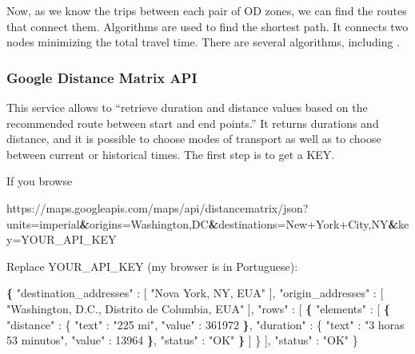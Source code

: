 \documentclass[12pt,graybox,envcountchap,sectrefs]{krantz}
\makeatletter
\newenvironment{Shaded}{\begin{snugshade}}{\end{snugshade}}
\newcommand{\KeywordTok}[1]{\textcolor[rgb]{0.13,0.29,0.53}{\textbf{#1}}}
\newcommand{\StringTok}[1]{\textcolor[rgb]{0.31,0.60,0.02}{#1}}
\newcommand{\VariableTok}[1]{\textcolor[rgb]{0.00,0.00,0.00}{#1}}
\newcommand{\BuiltInTok}[1]{#1}
\newcommand{\ExtensionTok}[1]{#1}
\newcommand{\NormalTok}[1]{#1}
\newenvironment{kframe}{%
\medskip{}
\setlength{\fboxsep}{.8em}
 \def\at@end@of@kframe{}%
 \ifinner\ifhmode%
  \def\at@end@of@kframe{\end{minipage}}%
  \begin{minipage}{\columnwidth}%
 \fi\fi%
 \def\FrameCommand##1{\hskip\@totalleftmargin \hskip-\fboxsep
 \colorbox{shadecolor}{##1}\hskip-\fboxsep
     \hskip-\linewidth \hskip-\@totalleftmargin \hskip\columnwidth}%
 \MakeFramed {\advance\hsize-\width
   \@totalleftmargin\z@ \linewidth\hsize
   \@setminipage}}%
 {\par\unskip\endMakeFramed%
 \at@end@of@kframe}
\renewenvironment{Shaded}{\begin{kframe}}{\end{kframe}}
\theoremstyle{definition}
\theoremstyle{definition}
\theoremstyle{definition}
\theoremstyle{remark}
\makeatother
\begin{document}
Now, as we know the trips between each pair of OD zones, we can find the
routes that connect them. Algorithms are used to find the shortest path.
It connects two nodes minimizing the total travel time. There are
several algorithms, including \citet{dijkstra1959note}.

\subsubsection{Google Distance Matrix
API}\label{google-distance-matrix-api}

This service allows to ``retrieve duration and distance values based on
the recommended route between start and end points.'' It returns
durations and distance, and it is possible to choose modes of transport
as well as to choose between current or historical times. The first step
is to get a KEY.

If you browse

\begin{Shaded}
\begin{Highlighting}[]
\ExtensionTok{https}\NormalTok{://maps.googleapis.com/maps/api/distancematrix/json?units=imperial}\KeywordTok{&}\VariableTok{origins=}\NormalTok{Washington,DC}\KeywordTok{&}\VariableTok{destinations=}\NormalTok{New+York+City,NY}\KeywordTok{&}\VariableTok{key=}\NormalTok{YOUR_API_KEY}
\end{Highlighting}
\end{Shaded}

Replace YOUR\_API\_KEY (my browser is in Portuguese):

\begin{Shaded}
\begin{Highlighting}[]
\KeywordTok{\{}
  \StringTok{"destination_addresses"} \BuiltInTok{:}\NormalTok{ [ }\StringTok{"Nova York, NY, EUA"}\NormalTok{ ],}
  \StringTok{"origin_addresses"} \BuiltInTok{:}\NormalTok{ [ }\StringTok{"Washington, D.C., Distrito de Columbia, EUA"}\NormalTok{ ],}
  \StringTok{"rows"} \BuiltInTok{:}\NormalTok{ [}
    \KeywordTok{\{}
      \StringTok{"elements"} \BuiltInTok{:}\NormalTok{ [}
        \KeywordTok{\{}
          \StringTok{"distance"} \BuiltInTok{:}\NormalTok{ \{}
            \StringTok{"text"} \BuiltInTok{:} \StringTok{"225 mi"}\NormalTok{,}
            \StringTok{"value"} \BuiltInTok{:}\NormalTok{ 361972}
          \KeywordTok{\}}\NormalTok{,}
          \StringTok{"duration"} \BuiltInTok{:}\NormalTok{ \{}
            \StringTok{"text"} \BuiltInTok{:} \StringTok{"3 horas 53 minutos"}\NormalTok{,}
            \StringTok{"value"} \BuiltInTok{:}\NormalTok{ 13964}
          \KeywordTok{\}}\NormalTok{,}
          \StringTok{"status"} \BuiltInTok{:} \StringTok{"OK"}
        \KeywordTok{\}}
\NormalTok{        ]}
\NormalTok{    \}}
\NormalTok{    ],}
  \StringTok{"status"} \BuiltInTok{:} \StringTok{"OK"}
\NormalTok{\}}
\end{Highlighting}
\end{Shaded}
\end{document}

